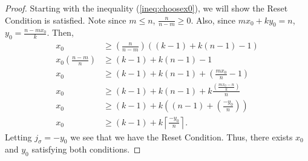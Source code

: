 \documentclass[10pt,a4paper]{amsart}
\begin{document}
\begin{proof}
  Starting with the inequality (\ref{ineq:choosex0}), we will show the Reset Condition is satisfied.   Note since $m\le n$, $\frac{n}{n-m} \geq 0$. Also, since $mx_0+ky_0 = n$, $y_0=\frac{n-mx_0}{k}$. Then,
    \begin{align*}
            x_0 &\geq \left( \frac{n}{n-m}\right) ((k-1)+k(n-1)-1)\\
            x_0 \left(\frac{n-m}{n}\right) &\geq (k-1)+k(n-1)-1\\
            x_0 &\geq (k-1) + k(n-1) +\left(\frac{mx_0}{n} - 1\right)\\
            x_0 &\geq (k-1) + k(n-1) + k \frac{\left(\frac{mx_0-n}{k}\right)}{n}\\
            x_0 &\geq (k-1) + k\left( (n-1) + \left(\frac{-y_0}{n}\right)\right)\\
            x_0 & \geq (k-1) + k \left\lceil \frac{-y_0}{n}\right\rceil.
        \end{align*}
Letting $j_\sigma = -y_0$ we see that we have the Reset Condition. Thus, there exists $x_0$ and $y_0$ satisfying both conditions.
\end{proof}
\end{document}
